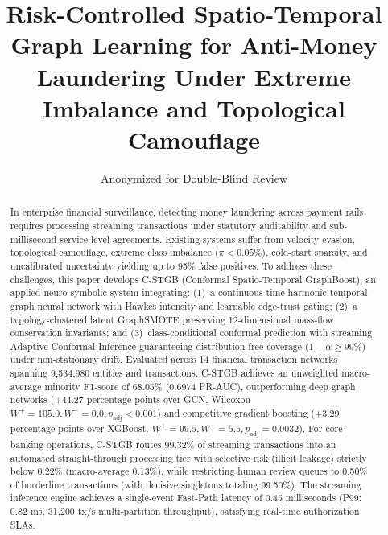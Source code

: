 \documentclass[a4paper,fleqn]{cas-dc}
\begin{document}
\let\WriteBookmarks\relax
\def\floatpagepagefraction{1}
\def\textpagefraction{.001}


\title [mode = title]{Risk-Controlled Spatio-Temporal Graph Learning for Anti-Money Laundering Under Extreme Imbalance and Topological Camouflage}  

\author{Anonymized for Double-Blind Review}

\begin{abstract}
In enterprise financial surveillance, detecting money laundering across payment rails requires processing streaming transactions under statutory auditability and sub-millisecond service-level agreements. Existing systems suffer from velocity evasion, topological camouflage, extreme class imbalance ($\pi < 0.05\%$), cold-start sparsity, and uncalibrated uncertainty yielding up to 95\% false positives. To address these challenges, this paper develops C-STGB (Conformal Spatio-Temporal GraphBoost), an applied neuro-symbolic system integrating: (1)~a continuous-time harmonic temporal graph neural network with Hawkes intensity and learnable edge-trust gating; (2)~a typology-clustered latent GraphSMOTE preserving 12-dimensional mass-flow conservation invariants; and (3)~class-conditional conformal prediction with streaming Adaptive Conformal Inference guaranteeing distribution-free coverage ($1-\alpha \ge 99\%$) under non-stationary drift. Evaluated across 14 financial transaction networks spanning 9,534,980 entities and transactions, C-STGB achieves an unweighted macro-average minority F1-score of 68.05\% (0.6974 PR-AUC), outperforming deep graph networks (+44.27 percentage points over GCN, Wilcoxon $W^+=105.0, W^-=0.0, p_{\text{adj}} < 0.001$) and competitive gradient boosting (+3.29 percentage points over XGBoost, $W^+=99.5, W^-=5.5, p_{\text{adj}}=0.0032$). For core-banking operations, C-STGB routes 99.32\% of streaming transactions into an automated straight-through processing tier with selective risk (illicit leakage) strictly below 0.22\% (macro-average 0.13\%), while restricting human review queues to 0.50\% of borderline transactions (with decisive singletons totaling 99.50\%). The streaming inference engine achieves a single-event Fast-Path latency of 0.45 milliseconds (P99: 0.82 ms, 31,200 tx/s multi-partition throughput), satisfying real-time authorization SLAs.
\end{abstract}
\end{document}
